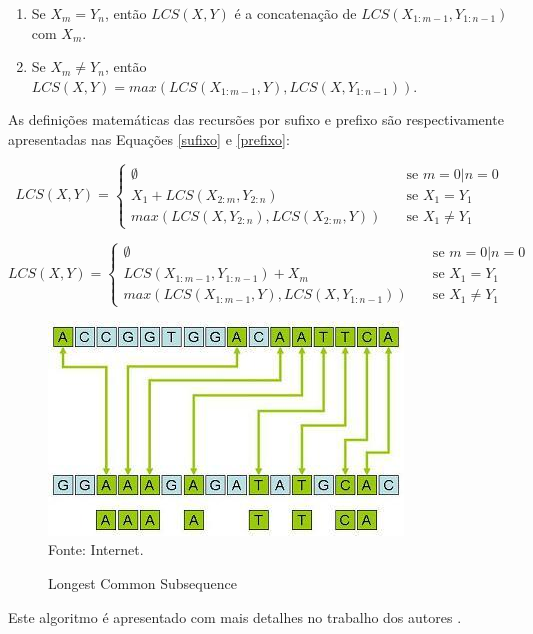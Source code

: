 \begin{enumerate}
    \begin{enumerate}
        \item Se \({X_{m}=Y_{n}}\), então \({LCS(X,Y)}\) é a concatenação de \({LCS(X_{1:m-1},Y_{1:n-1})}\) com \({X_{m}}\).
        \item Se \({X_{m} \not= Y_{n}}\), então \({LCS(X,Y)=max(LCS(X_{1:m-1},Y), LCS(X,Y_{1:n-1}))}\).
    \end{enumerate}
    
    As definições matemáticas das recursões por sufixo e prefixo são respectivamente apresentadas nas Equações \ref{sufixo} e \ref{prefixo}:
    
    \begin{equation} \label{sufixo}
        LCS(X,Y) =
            \begin{cases}
            \emptyset & \quad \textrm{se } m=0 | n=0\\
            X_{1}+LCS(X_{2:m},Y_{2:n})  & \quad \textrm{se } X_{1}=Y_{1}\\
            max(LCS(X,Y_{2:n}),LCS(X_{2:m},Y)) & \quad \textrm{se } X_{1}\not=Y_{1}
            \end{cases}
    \end{equation}
    
    \begin{equation} \label{prefixo}
        LCS(X,Y) =
            \begin{cases}
            \emptyset & \quad \textrm{se } m=0 | n=0\\
            LCS(X_{1:m-1},Y_{1:n-1})+X_{m}  & \quad \textrm{se } X_{1}=Y_{1}\\
            max(LCS(X_{1:m-1},Y),LCS(X,Y_{1:n-1})) & \quad \textrm{se } X_{1}\not=Y_{1}
            \end{cases}
    \end{equation}
    
    \begin{figure}[!htb]
       \centering
       \caption{Longest Common Subsequence}\label{fig:lcs} 
       \includegraphics[scale=1.0]{figuras/lcs.jpg}
       \\Fonte: Internet.
    \end{figure}
    
    Este algoritmo é apresentado com mais detalhes no trabalho dos autores .

\end{enumerate}

